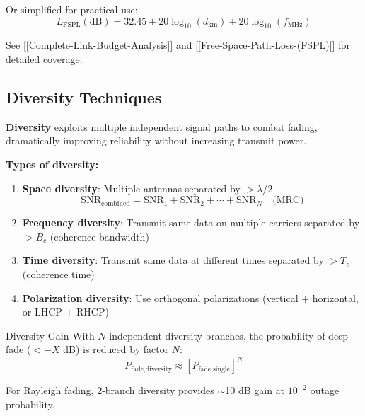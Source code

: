 Or simplified for practical use:
\begin{equation}
L_{\text{FSPL}}(\text{dB}) = 32.45 + 20\log_{10}(d_{\text{km}}) + 20\log_{10}(f_{\text{MHz}})
\label{eq:fspl_simple}
\end{equation}

See {[}{[}Complete-Link-Budget-Analysis{]}{]} and {[}{[}Free-Space-Path-Loss-(FSPL){]}{]} for detailed coverage.

\subsection{Diversity Techniques}

\textbf{Diversity} exploits multiple independent signal paths to combat fading, dramatically improving reliability without increasing transmit power.

\textbf{Types of diversity:}

\begin{enumerate}
\item \textbf{Space diversity}: Multiple antennas separated by $> \lambda/2$
\begin{equation}
\text{SNR}_{\text{combined}} = \text{SNR}_1 + \text{SNR}_2 + \cdots + \text{SNR}_N \quad \text{(MRC)}
\label{eq:mrc}
\end{equation}

\item \textbf{Frequency diversity}: Transmit same data on multiple carriers separated by $> B_c$ (coherence bandwidth)

\item \textbf{Time diversity}: Transmit same data at different times separated by $> T_c$ (coherence time)

\item \textbf{Polarization diversity}: Use orthogonal polarizations (vertical + horizontal, or LHCP + RHCP)
\end{enumerate}

\begin{calloutbox}{Diversity Gain}
With $N$ independent diversity branches, the probability of deep fade ($< -X$ dB) is reduced by factor $N$:
\begin{equation}
P_{\text{fade,diversity}} \approx [P_{\text{fade,single}}]^N
\end{equation}

For Rayleigh fading, 2-branch diversity provides $\sim$10 dB gain at $10^{-2}$ outage probability.
\end{calloutbox}


